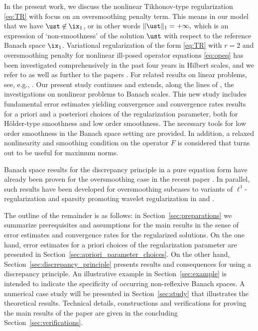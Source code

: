\documentclass[10pt]{article}
\theoremstyle{definition}
\begin{document}
%

%
In the present work, we discuss the nonlinear Tikhonov-type regularization \eqref{eq:TR} with focus on an oversmoothing penalty term. This means in our model that we have $ \ust \not \in \ix_1 $, or in other words $\|\ust\|_1=+\infty,$ which is an expression of
`non-smoothness' of the solution $\ust$ with respect to the reference Banach space $\ix_1$. Variational regularization of the form \eqref{eq:TR} with $r=2$ and oversmoothing penalty for nonlinear ill-posed operator equations \eqref{eq:opeq} has been investigated comprehensively in the past four years in Hilbert scales, and we refer to \cite{Hofmann_Mathe18,HofPla20} as well as further to the papers \cite{GHH20,HofHof20,HHMP22,HofMat20,KliPla22}. For related results on linear problems, see, e.g.,
\cite{Natterer84}.
Our present study continues and extends, along the lines of \cite{HofPla20}, the investigations on nonlinear problems to Banach scales. This new study includes fundamental error estimates
yielding convergence and convergence rates results for a priori and a posteriori choices  of the regularization parameter,
both for H\"older-type smoothness and low order smoothness.
The necessary tools for low order smoothness in the Banach space setting are provided.
In addition, a relaxed nonlinearity and smoothing condition on the operator $F$
is considered that turns out to be useful for maximum norms.

Banach space results for the discrepancy principle in a pure equation form have already been proven for the oversmoothing case in the recent paper \cite{CHY21}. In parallel, such results have been developed for oversmoothing subcases to variants of $\ell^1$-regularization and sparsity promoting wavelet regularization in \cite[Sec.~5]{Miller21} and \cite{MillerHohage22}.

The outline of the remainder is as follows: in Section~\ref{sec:preparations} we summarize prerequisites and assumptions for the main results in the sense of error estimates and convergence rates for the regularized solutions. On the one hand, error estimates for a priori choices of the regularization parameter are presented in Section~\ref{sec:apriori_parameter_choices}. On the other hand, Section~\ref{sec:discrepancy_principle} presents results and consequences for using a discrepancy principle. An illustrative example in Section~\ref{sec:example} is intended to indicate the specificity of occurring non-reflexive Banach spaces. A numerical case study will be presented in Section~\ref{sec:study} that illustrates the theoretical results.
Technical details, constructions and verifications for proving the main results of the paper are given in the concluding Section~\ref{sec:verifications}.
\end{document}
